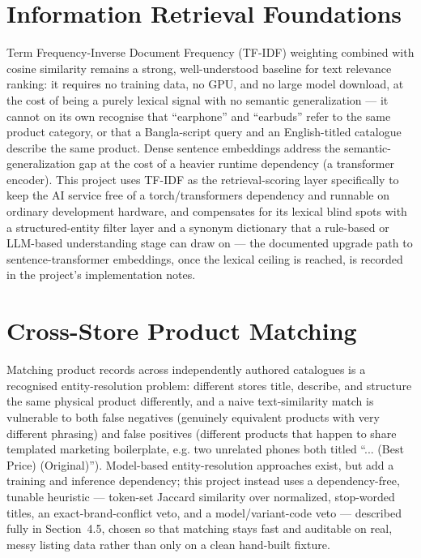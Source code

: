 \documentclass[12pt,a4paper]{report}
\begin{document}
\section{Information Retrieval Foundations}
Term Frequency-Inverse Document Frequency (TF-IDF) weighting combined with cosine similarity
\cite{manning2008} remains a strong, well-understood baseline for text relevance ranking: it requires no
training data, no GPU, and no large model download, at the cost of being a purely lexical signal with no
semantic generalization --- it cannot on its own recognise that ``earphone'' and ``earbuds'' refer to the
same product category, or that a Bangla-script query and an English-titled catalogue describe the same
product. Dense sentence embeddings \cite{reimers2019} address the semantic-generalization gap at the cost
of a heavier runtime dependency (a transformer encoder). This project uses TF-IDF as the retrieval-scoring
layer specifically to keep the AI service free of a torch/transformers dependency and runnable on ordinary
development hardware, and compensates for its lexical blind spots with a structured-entity filter layer
and a synonym dictionary that a rule-based or LLM-based understanding stage can draw on --- the documented
upgrade path to sentence-transformer embeddings, once the lexical ceiling is reached, is recorded in the
project's implementation notes.

\section{Cross-Store Product Matching}
Matching product records across independently authored catalogues is a recognised entity-resolution
problem: different stores title, describe, and structure the same physical product differently, and a
naive text-similarity match is vulnerable to both false negatives (genuinely equivalent products with very
different phrasing) and false positives (different products that happen to share templated marketing
boilerplate, e.g. two unrelated phones both titled ``... (Best Price) (Original)''). Model-based
entity-resolution approaches exist, but add a training and inference dependency; this project instead uses
a dependency-free, tunable heuristic --- token-set Jaccard similarity over normalized, stop-worded titles,
an exact-brand-conflict veto, and a model/variant-code veto --- described fully in Section~4.5, chosen so
that matching stays fast and auditable on real, messy listing data rather than only on a clean hand-built
fixture.
\end{document}
